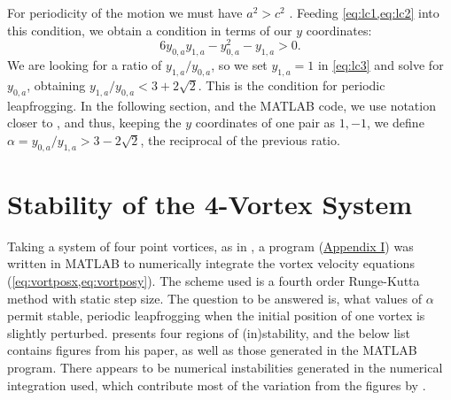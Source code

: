 \documentclass[10pt, a4paper]{article}
\numberwithin{equation}{section}
\begin{document}
For periodicity of the motion we must have $a^2 > c^2$ \citep{love94}.
Feeding \cref{eq:lc1,eq:lc2} into this condition, we obtain a condition in terms of our $y$ coordinates:
\begin{equation}
6y_{0,a}y_{1,a}-y_{0,a}^2 -y_{1,a} >0 \label{eq:lc3}.
\end{equation}
We are looking for a ratio of $y_{1,a}/y_{0,a}$, so we set $y_{1,a}=1$
in \cref{eq:lc3} and solve for $y_{0,a}$, obtaining
$y_{1,a}/y_{0,a}<3+2\sqrt{2}$.  This is the condition for periodic
leapfrogging.  In the following section, and the MATLAB code, we use
notation closer to \citeauthor{acheson00}, and thus, keeping the $y$ coordinates of one pair as $1,-1$, we define
$\alpha=y_{0,a}/y_{1,a}> 3-2\sqrt{2}$, the reciprocal of the previous ratio.
\clearpage
\section{Stability of the 4-Vortex System}
Taking a system of four point vortices, as in \citet{acheson00}, a program (\hyperref[sec:ap1]{Appendix I}) was written in MATLAB to numerically integrate the vortex velocity equations (\cref{eq:vortposx,eq:vortposy}).
The scheme used is a fourth order Runge-Kutta method with static step size.
The question to be answered is, what values of $\alpha$ permit stable, periodic leapfrogging when the initial position of one vortex is slightly perturbed.
\citeauthor{acheson00} presents four regions of (in)stability, and the below list contains figures from his \citeyear{acheson00} paper, as well as those generated in the MATLAB program.
There appears to be numerical instabilities generated in the numerical integration used, which contribute most of the variation from the figures by \citeauthor{acheson00}.
\end{document}

